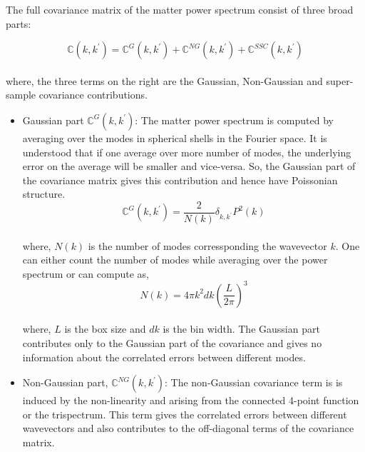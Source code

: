 The full covariance matrix of the matter power spectrum consist of three broad parts:

\begin{equation}
	\mathbb{C}(k,k^{\prime}) = \mathbb{C}^{G}(k,k^{\prime}) + 
								\mathbb{C}^{NG}(k,k^{\prime}) + 
								\mathbb{C}^{SSC}(k,k^{\prime})
\end{equation}
\\
where, the three terms on the right are the Gaussian, Non-Gaussian and super-sample covariance contributions. 

\begin{itemize}
	\item Gaussian part $\mathbb{C}^{G}(k,k^{\prime})$: The matter power spectrum is computed
			by averaging over the modes in spherical shells in the Fourier space. It 
			is understood that if one average over more number of modes, the underlying
			error on the average will be smaller and vice-versa. So, the Gaussian part
			of the covariance matrix gives this contribution and hence have Poissonian
			structure. 
			\begin{equation}
				\mathbb{C}^{G}(k,k^{\prime}) = \dfrac{2}{N(k)} \delta_{k,k^{\prime}} P^2(k)
			\end{equation}
			\\
			where, $N(k)$ is the number of modes corressponding the wavevector $k$. One 
			can either count the number of modes while averaging over the power spectrum
			or can compute as,
			\begin{equation}
				N(k) = 4 \pi k^2 dk \left( \dfrac{L}{2\pi} \right)^3
			\end{equation}
			\\
			where, $L$ is the box size and $dk$ is the bin width. The Gaussian part 
			contributes only to the Gaussian part of the covariance and gives no 
			information about the correlated errors between different modes. 

	\item Non-Gaussian part, $\mathbb{C}^{NG}(k,k^{\prime})$: The non-Gaussian covariance term is 
			is induced by the non-linearity and arising from the connected 4-point function or the trispectrum. This term gives the correlated errors between
			different wavevectors and also contributes to the off-diagonal terms
			of the covariance matrix. 


\end{itemize}

